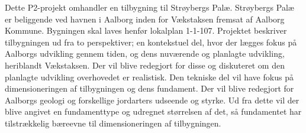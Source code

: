 Dette P2-projekt omhandler en tilbygning til Strøybergs Palæ.
\newline
\newline
Strøybergs Palæ er beliggende ved havnen i Aalborg inden for Vækstaksen fremsat af Aalborg Kommune. Bygningen skal laves henfør lokalplan 1-1-107. Projektet beskriver tilbygningen ud fra to perspektiver; en kontekstuel del, hvor der lægges fokus på Aalborgs udvikling gennem tiden, og dens nuværende og planlagte udvikling, heriblandt Vækstaksen. Der vil blive redegjort for disse og diskuteret om den planlagte udvikling overhovedet er realistisk. Den tekniske del vil have fokus på dimensioneringen af tilbygningen og dens fundament. Der vil blive redegjort for Aalborgs geologi og forskellige jordarters udseende og styrke. Ud fra dette vil der blive angivet en fundamenttype og udregnet størrelsen af det, så fundamentet har tilstrækkelig bæreevne til dimensioneringen af tilbygningen.
